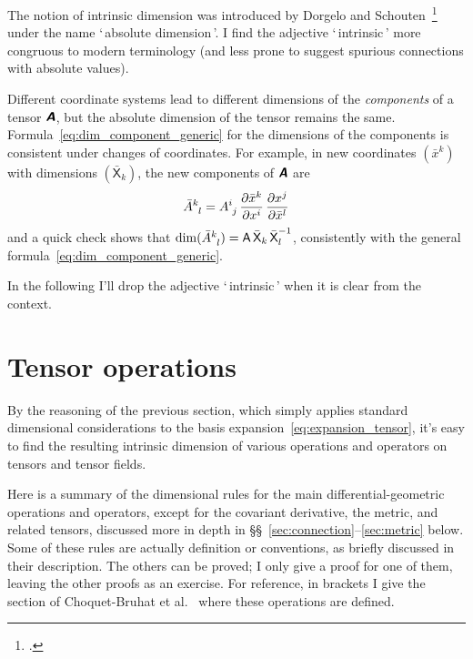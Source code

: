 \documentclass[a4paper,12pt,onecolumn,oneside,article,british]{memoir}
\newcommand*{\defquote}[1]{`\,#1\,'}
\newcommand*{\mathte}[1]{\textbf{\textit{\textsf{#1}}}}
\newcommand*{\citep}{\footcites}
\newcommand*{\citey}{\parencites*}%
\newcommand*{\de}{\partial}%
\newcommand*{\sects}{\S\S}%
\newcommand*{\chap}{ch.}%
\newcommand*{\etal}{{et al.}}
\newcommand*{\Xx}{\textsf{X}}
\newcommand*{\Aa}{\textsf{A}}
\newcommand*{\yA}{\mathte{A}}
\renewcommand*{\i}{\indices}
\begin{document}
The notion of intrinsic dimension was introduced by Dorgelo and
Schouten~\citep{dorgeloetal1946}[\chap~VI]{schouten1951_r1989} under the
name \defquote{absolute dimension}. I find the adjective
\defquote{intrinsic} more congruous to modern terminology (and less prone
to suggest spurious connections with absolute values).



\medskip

Different coordinate systems lead to different dimensions of the
\emph{components} of a tensor $\yA$, but the absolute dimension of the
tensor remains the same. Formula~\eqref{eq:dim_component_generic} for the
dimensions of the components is consistent under changes of coordinates.
For example, in new coordinates $({\bar{x}}^{k})$ with dimensions
$({\bar{\Xx}}_{k})$, the new components of $\yA$ are
\begin{equation}
  \label{eq:coords_change}
  \bar{A}\i{^{k}_{l}} = A\i{^{i}_{j}}
  \,\frac{\de \bar{x}^{k}}{\de x^{i}}
  \,\frac{\de {x}^{j}}{\de \bar{x}^{l}}
\end{equation}
and a quick check shows that
$\dim(\bar{A}\i{^{k}_{l}}) = \Aa\,\bar{\Xx}_{k}\,{\bar{\Xx}_{l}}^{-1}$, consistently
with the general formula~\eqref{eq:dim_component_generic}. %

\smallskip

In the following I'll drop the adjective \defquote{intrinsic} when it is
clear from the context.

\section{Tensor operations}
\label{sec:tensor_ops}

By the reasoning of the previous section, which simply applies standard
dimensional considerations to the basis
expansion~\eqref{eq:expansion_tensor}, it's easy to find the resulting
intrinsic dimension of various operations and operators on tensors and
tensor fields.

Here is a summary of the dimensional rules for the main
differential-geometric operations and operators, except for the covariant
derivative, the metric, and related tensors, discussed more in depth in
\sects~\ref{sec:connection}--\ref{sec:metric} below. Some of these rules
are actually definition or conventions, as briefly discussed in their
description. The others can be proved; I only give a proof for one of them,
leaving the other proofs as an exercise. For reference, in brackets I give
the section of Choquet-Bruhat \etal\ \citey{choquetbruhatetal1977_r1996}
where these operations are defined.
\end{document}
